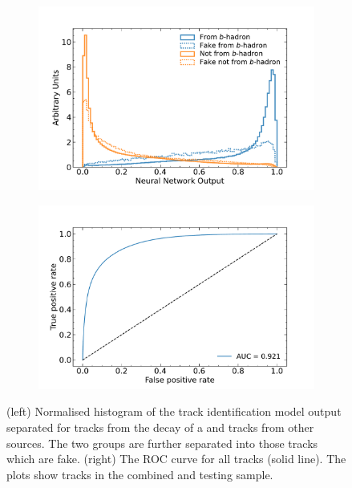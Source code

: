 
\begin{figure}[!htbp]
  \centering
  \begin{subfigure}[b]{0.48\textwidth}
      \centering
      \includegraphics[width=\textwidth]{chapters/4.track_classifier/figs/b_id_output.pdf}
  \end{subfigure}
  \quad
  \begin{subfigure}[b]{0.48\textwidth}
      \centering
      \includegraphics[width=\textwidth]{chapters/4.track_classifier/figs/b_id_roc.pdf}
  \end{subfigure}
  \caption{
    (left) Normalised histogram of the \bhadron track identification model output separated for tracks from the decay of a \bhadron and tracks from other sources.
    The two groups are further separated into those tracks which are fake.
    (right) The ROC curve for all tracks (solid line).
    The plots show tracks in the combined \ttbar and \Zprime testing sample.
  }
  \label{fig:b_id_output_roc}
\end{figure}


